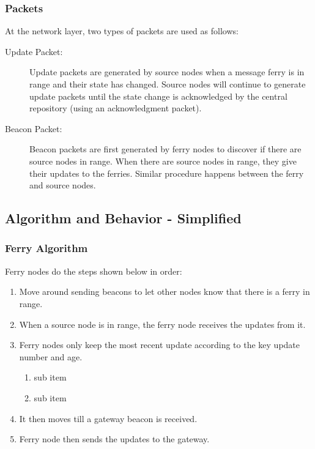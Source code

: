 \subsubsection{Packets}

At the network layer, two types of packets are used as follows:

\begin{description}
\item[Update Packet: ]
Update packets are generated by source nodes when a message ferry is in range and their state has changed. 
Source nodes will continue to generate update packets until the state change is acknowledged by the central repository (using an acknowledgment packet).
\item[Beacon Packet: ] 
Beacon packets are first generated by ferry nodes to discover if there are source nodes in range. 
When there are source nodes in range, they give their updates to the ferries. Similar procedure happens between the ferry and source nodes. 
\end{description}

\subsection{Algorithm and Behavior - Simplified}

\subsubsection{Ferry Algorithm}

Ferry nodes do the steps shown below in order:

\begin{enumerate}
\item Move around sending beacons to let other nodes know that there is a ferry in range.
\item When a source node is in range, the ferry node receives the updates from it.
\item Ferry nodes only keep the most recent update according to the key update number and age.
	\begin{enumerate}
	\item sub item
	\item sub item
	\end{enumerate}
\item It then moves till a gateway beacon is received.
\item Ferry node then sends the updates to the gateway.
\end{enumerate}

